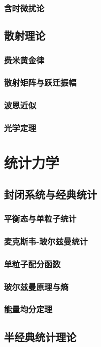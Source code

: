 \documentclass[a4paper]{report}
\begin{document}
\section{含时微扰论}

\chapter{散射理论}
\section{费米黄金律}
\section{散射矩阵与跃迁振幅}
\section{波恩近似}
\section{光学定理}


\part{统计力学}
\chapter{封闭系统与经典统计}
\section{平衡态与单粒子统计}
\section{麦克斯韦-玻尔兹曼统计}
\section{单粒子配分函数}
\section{玻尔兹曼原理与熵}
\section{能量均分定理}
\chapter{半经典统计理论}
\end{document}
